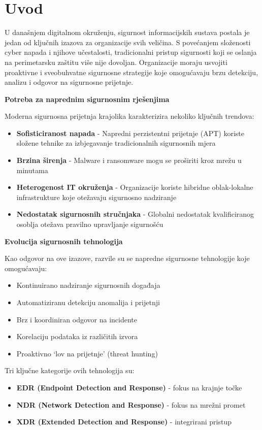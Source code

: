 \chapter{Uvod}

U današnjem digitalnom okruženju, sigurnost informacijskih sustava postala je jedan od ključnih izazova za organizacije svih veličina. S povećanjem složenosti cyber napada i 
njihove učestalosti, tradicionalni pristup sigurnosti koji se oslanja na perimetarsku zaštitu više nije dovoljan. Organizacije moraju usvojiti proaktivne i sveobuhvatne sigurnosne 
strategije koje omogućavaju brzu detekciju, analizu i odgovor na sigurnosne prijetnje.

\textbf{Potreba za naprednim sigurnosnim rješenjima}

Moderna sigurnosna prijetnja krajolika karakterizira nekoliko ključnih trendova:

\begin{itemize}
\item \textbf{Sofisticiranost napada} - Napredni perzistentni prijetnje (APT) koriste složene tehnike za izbjegavanje tradicionalnih sigurnosnih mjera
\item \textbf{Brzina širenja} - Malware i ransomware mogu se proširiti kroz mrežu u minutama
\item \textbf{Heterogenost IT okruženja} - Organizacije koriste hibridne oblak-lokalne infrastrukture koje otežavaju sigurnosno nadziranje
\item \textbf{Nedostatak sigurnosnih stručnjaka} - Globalni nedostatak kvalificiranog osoblja otežava pravilno upravljanje sigurnošću
\end{itemize}

\textbf{Evolucija sigurnosnih tehnologija}

Kao odgovor na ove izazove, razvile su se napredne sigurnosne tehnologije koje omogućavaju:

\begin{itemize}
\item Kontinuirano nadziranje sigurnosnih događaja
\item Automatiziranu detekciju anomalija i prijetnji
\item Brz i koordiniran odgovor na incidente
\item Korelaciju podataka iz različitih izvora
\item Proaktivno `lov na prijetnje' (threat hunting)
\end{itemize}

Tri ključne kategorije ovih tehnologija su:
\begin{itemize}
\item \textbf{EDR (Endpoint Detection and Response)} - fokus na krajnje točke
\item \textbf{NDR (Network Detection and Response)} - fokus na mrežni promet
\item \textbf{XDR (Extended Detection and Response)} - integrirani pristup
\end{itemize}

